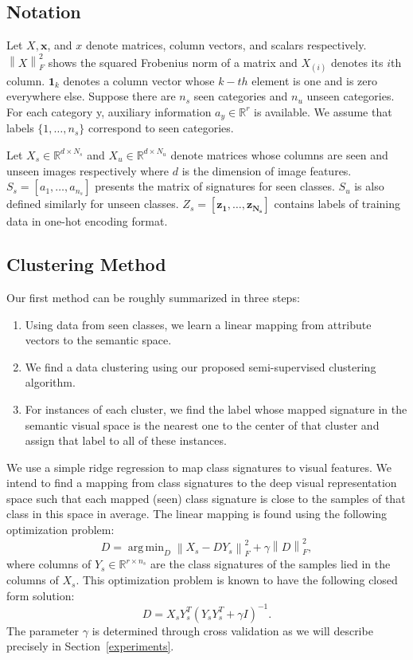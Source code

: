 \documentclass[10pt,twocolumn,letterpaper]{article}
\newcommand{\norm}[1]{\left \lVert #1 \right \rVert_{F}^2}
\DeclareMathOperator*{\argmin}{arg\,min}
\begin{document}
\subsection{Notation}
Let $X, \mathbf{x}$, and $x$ denote matrices, column vectors, and scalars respectively. $\norm{X}$ shows the squared Frobenius norm of a matrix and
$X_{(i)}$ denotes its $i$th column. $\mathbf{1}_k$ denotes a column vector whose $k-th$ element is one and is zero everywhere else.
Suppose there are $n_s$ seen categories and $n_u$ unseen categories. For each category y,
auxiliary information $a_y \in \mathbb{R}^r$ is available. We assume that labels $\{1, \ldots, n_s \}$ correspond to seen categories.

Let $X_s \in \mathbb{R}^{d \times N_s}$ and $X_u \in \mathbb{R}^{d \times N_u}$
denote matrices whose columns are seen and unseen images respectively where $d$ is the dimension of image features.
$S_s = [a_1, \ldots, a_{n_s}]$ presents the matrix of signatures for seen classes. $S_u$ is also defined similarly for unseen classes.
$Z_s = [ \mathbf{z_1}, \ldots, \mathbf{z_{N_s}} ]$
contains labels of training data in one-hot encoding format.

\subsection{Clustering Method} \label{clustering}
Our first method can be roughly summarized in three steps:
\begin{enumerate}
  \item Using data from seen classes, we learn a linear mapping from attribute vectors to the semantic space.
  \item We find a data clustering using our proposed semi-supervised clustering algorithm.
  \item For instances of each cluster, we find the label whose mapped signature in the semantic visual space is the nearest one to the center of that cluster and assign that label to all of these instances.
\end{enumerate}

We use a simple ridge regression to map class signatures to visual features. We intend to find a mapping from class signatures to the deep visual representation space such that each mapped (seen) class signature is close to the samples of that class in this space in average.
The linear mapping is found using the following optimization problem:
\begin{equation} \label{eq:mapping}
  D = \argmin_D \norm{X_s - D Y_s} + \gamma \norm{D},
\end{equation}
where columns of $ Y_s \in \mathbb{R}^{r \times n_s} $ are the class signatures of the samples lied in the columns of $X_s$.
This optimization problem is known to have the following closed form solution:
\begin{equation} \label{eq:dic}
  D = X_s Y_s^T (Y_s Y_s^T + \gamma I)^{-1}.
\end{equation}
The parameter $\gamma$ is determined through cross validation as we will describe precisely in Section~\ref{experiments}.
\end{document}
